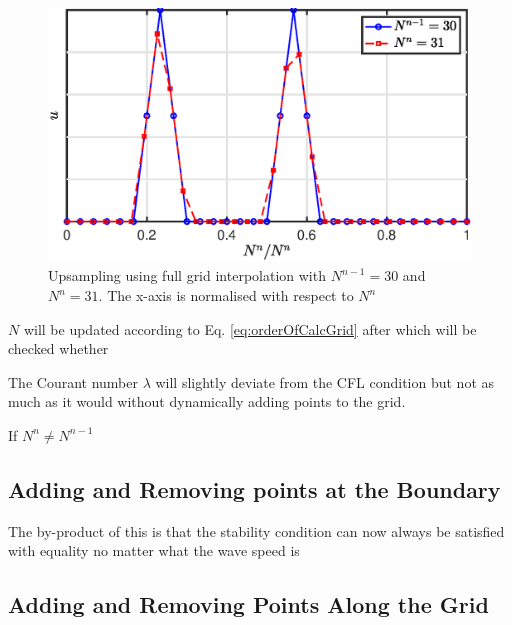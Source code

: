 \documentclass[dvipsnames, preprint]{JASA}
\begin{document}
\begin{figure}
\includegraphics[width=\reprintcolumnwidth]{fullGrid}
\caption{\label{fig:fullGrid}{Upsampling using full grid interpolation with $N^{n-1} = 30$ and $N^n = 31$. The x-axis is normalised with respect to $N^n$}}
\end{figure} 

$N$ will be updated according to Eq. \eqref{eq:orderOfCalcGrid} after which will be checked whether 

The Courant number $\lambda$ will slightly deviate from the CFL condition but not as much as it would without dynamically adding points to the grid.

If $N^n \neq N^{n-1}$
\subsection{Adding and Removing points at the Boundary}
The by-product of this is that the stability condition can now always be satisfied with equality no matter what the wave speed is

\subsection{Adding and Removing Points Along the Grid}



\end{document}
